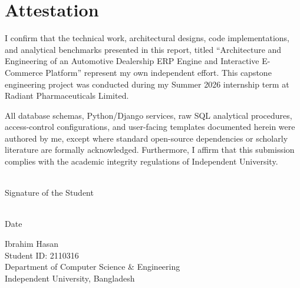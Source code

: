 \chapter*{Attestation}

I confirm that the technical work, architectural designs, code implementations, and analytical benchmarks presented in this report, titled ``Architecture and Engineering of an Automotive Dealership ERP Engine and Interactive E-Commerce Platform'' represent my own independent effort. This capstone engineering project was conducted during my Summer 2026 internship term at Radiant Pharmaceuticals Limited.

All database schemas, Python/Django services, raw SQL analytical procedures, access-control configurations, and user-facing templates documented herein were authored by me, except where standard open-source dependencies or scholarly literature are formally acknowledged. Furthermore, I affirm that this submission complies with the academic integrity regulations of Independent University.

\vspace{2cm}

\noindent
\begin{minipage}{0.45\linewidth}
\makebox[2.5in]{\dotfill}\\
Signature of the Student
\end{minipage}%
\hfill
\begin{minipage}{0.45\linewidth}
\makebox[2.5in]{\dotfill}\\
Date
\end{minipage}

\vspace{1cm}

\noindent
Ibrahim Hasan\\
Student ID: 2110316\\
Department of Computer Science \& Engineering\\
Independent University, Bangladesh
